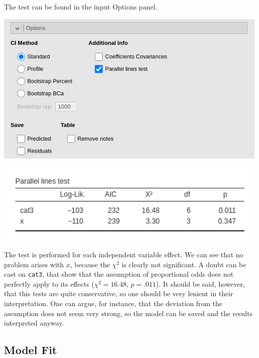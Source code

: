 \documentclass[
]{book}
\begin{document}
The test can be found in the input {Options} panel.

\includegraphics[width=7.94in]{bookletpics/3_ordinal_input2}

\includegraphics[width=5.85in]{bookletpics/3_ordinal_output7}

The test is performed for each independent variable effect. We can see that no problem arises with \(x\), because the \(\chi^2\) is clearly not significant. A doubt can be cast on \texttt{cat3}, that show that the assumption of proportional odds does not perfectly apply to its effects (\(\chi^2=16.48\), \(p=.011\)). It should be said, however, that this tests are quite conservative, so one should be very lenient in their interpretation. One can argue, for instance, that the deviation from the assumption does not seem very strong, so the model can be saved and the results interpreted anyway.

\hypertarget{model-fit-2}{%
\subsection{Model Fit}\label{model-fit-2}}
\end{document}
